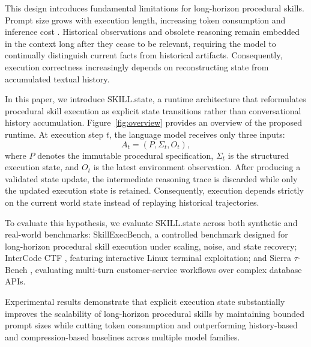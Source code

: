 \documentclass[11pt]{article}
\begin{document}
This design introduces fundamental limitations for long-horizon procedural skills. Prompt size grows with execution length, increasing token consumption and inference cost \citep{liu2024lost, xiao2023streamingllm}. Historical observations and obsolete reasoning remain embedded in the context long after they cease to be relevant, requiring the model to continually distinguish current facts from historical artifacts. Consequently, execution correctness increasingly depends on reconstructing state from accumulated textual history.

In this paper, we introduce SKILL.state, a runtime architecture that reformulates procedural skill execution as explicit state transitions rather than conversational history accumulation. Figure~\ref{fig:overview} provides an overview of the proposed runtime. At execution step $t$, the language model receives only three inputs:
\begin{equation}
A_t = (P,\Sigma_t,O_t),
\end{equation}
where $P$ denotes the immutable procedural specification, $\Sigma_t$ is the structured execution state, and $O_t$ is the latest environment observation. After producing a validated state update, the intermediate reasoning trace is discarded while only the updated execution state is retained. Consequently, execution depends strictly on the current world state instead of replaying historical trajectories.

To evaluate this hypothesis, we evaluate SKILL.state across both synthetic and real-world benchmarks: SkillExecBench, a controlled benchmark designed for long-horizon procedural skill execution under scaling, noise, and state recovery; InterCode CTF \citep{yang2023intercode}, featuring interactive Linux terminal exploitation; and Sierra $\tau$-Bench \citep{yao2024tau}, evaluating multi-turn customer-service workflows over complex database APIs.

Experimental results demonstrate that explicit execution state substantially improves the scalability of long-horizon procedural skills by maintaining bounded prompt sizes while cutting token consumption and outperforming history-based and compression-based baselines across multiple model families.
\end{document}
